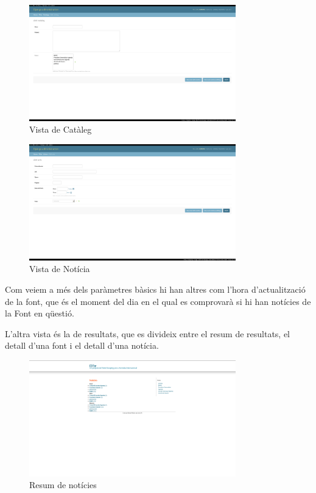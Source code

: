 \documentclass{article}
\begin{document}
\begin{figure}[!ht]
    \centering
    \includegraphics[width=0.8\textwidth]{addcataleg.png}
    \caption{Vista de Catàleg}
\end{figure}

\begin{figure}[!ht]
    \centering
    \includegraphics[width=0.8\textwidth]{addavis.png}
    \caption{Vista de Notícia}
\end{figure}

\newpage

Com veiem a més dels paràmetres bàsics hi han altres com l'hora d'actualització de la font, que és el moment del dia en el qual es comprovarà si hi han notícies de la Font en qüestió.

L'altra vista és la de resultats, que es divideix entre el resum de resultats, el detall d'una font i el detall d'una notícia.


\begin{figure}[!ht]
    \centering
    \includegraphics[width=0.8\textwidth]{resum.png}
    \caption{Resum de notícies}
\end{figure}
\end{document}
